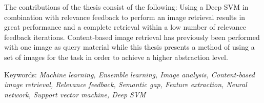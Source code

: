 The contributions of the thesis consist of the following: Using a Deep SVM in combination with relevance feedback to perform an image retrieval results in great performance and a complete retrieval within a low number of relevance feedback iterations. Content-based image retrieval has previously been performed with one image as query material while this thesis presents a method of using a set of images for the task in order to achieve a higher abstraction level. 

\vfill
Keywords: \textit{Machine learning, Ensemble learning, Image analysis, Content-based image retrieval, Relevance feedback, Semantic gap, Feature extraction, Neural network, Support vector machine, Deep SVM}

\thispagestyle{empty}
\mbox{}